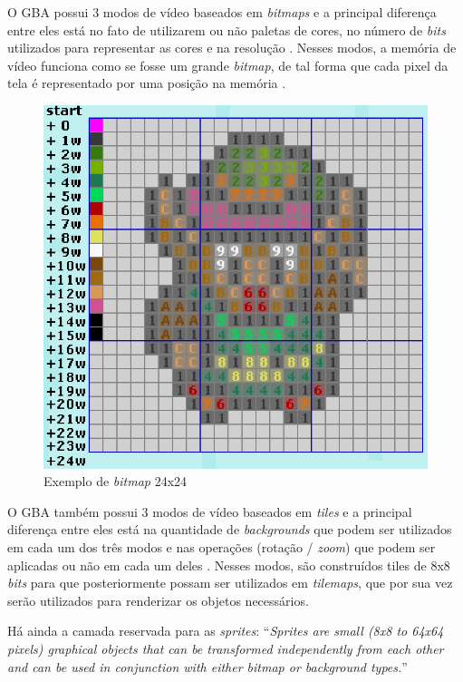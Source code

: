 O GBA possui 3 modos de vídeo baseados em \textit{bitmaps} e a principal diferença entre eles está no fato de utilizarem ou não paletas de cores, no número de \textit{bits} utilizados para representar as cores e na resolução \cite{harbour}. Nesses modos, a memória de vídeo funciona como se fosse um grande \textit{bitmap}, de tal forma que cada pixel da tela é representado por uma posição na memória \cite{tonc}.

\begin{figure}[H]
 \centering \includegraphics[keepaspectratio=true,scale=0.6]{figuras/link-bitmap.eps}
   \caption{Exemplo de \textit{bitmap} 24x24}
   \label{link-bitmap}
\end{figure}

O GBA também possui 3 modos de vídeo baseados em \textit{tiles} e a principal diferença entre eles está na quantidade de \textit{backgrounds} que podem ser utilizados em cada um dos três modos e nas operações (rotação / \textit{zoom}) que podem ser aplicadas ou não em cada um deles \cite{harbour}. Nesses modos, são construídos tiles de 8x8 \textit{bits} para que posteriormente possam ser utilizados em \textit{tilemaps}, que por sua vez serão utilizados para renderizar os objetos necessários. \cite{tonc}

Há ainda a camada reservada para as \textit{sprites}: ``\textit{Sprites are small (8x8 to 64x64 pixels) graphical objects that can be transformed independently from each other and can be used in conjunction with either bitmap or background types.}'' \cite[p. 38]{tonc}

